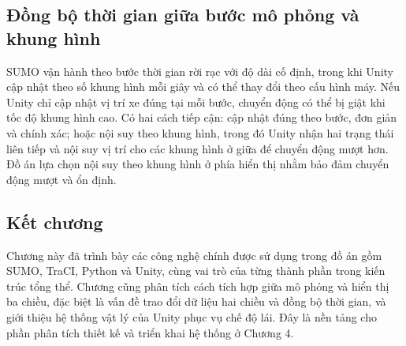 ﻿\documentclass[../DoAn.tex]{subfiles}
\begin{document}
\subsection{Đồng bộ thời gian giữa bước mô phỏng và khung hình}

\gls{SUMO} vận hành theo bước thời gian rời rạc với độ dài cố định, trong khi
Unity cập nhật theo số khung hình mỗi giây và có thể thay đổi theo cấu hình máy.
Nếu Unity chỉ cập nhật vị trí xe đúng tại mỗi bước, chuyển động có thể bị giật
khi tốc độ khung hình cao. Có hai cách tiếp cận: cập nhật đúng theo bước, đơn
giản và chính xác; hoặc nội suy theo khung hình, trong đó Unity nhận hai trạng
thái liên tiếp và nội suy vị trí cho các khung hình ở giữa để chuyển động mượt
hơn. Đồ án lựa chọn nội suy theo khung hình ở phía hiển thị nhằm bảo đảm chuyển
động mượt và ổn định.

\subsection{Kết chương}

Chương này đã trình bày các công nghệ chính được sử dụng trong đồ án gồm
\gls{SUMO}, \gls{TraCI}, Python và Unity, cùng vai trò của từng thành phần trong
kiến trúc tổng thể. Chương cũng phân tích cách tích hợp giữa mô phỏng và hiển thị
ba chiều, đặc biệt là vấn đề trao đổi dữ liệu hai chiều và đồng bộ thời gian, và
giới thiệu hệ thống vật lý của Unity phục vụ chế độ lái. Đây là nền tảng cho phần
phân tích thiết kế và triển khai hệ thống ở Chương 4.
\end{document}
